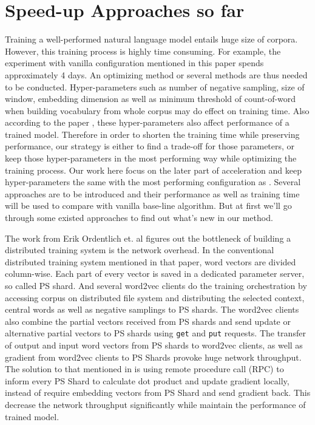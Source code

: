 \section{Speed-up Approaches so far}
Training a well-performed natural language model entails huge size of corpora. However, this training process is highly time consuming. For example, the experiment with vanilla configuration mentioned in this paper spends approximately 4 days. An optimizing method or several methods are thus needed to be conducted. Hyper-parameters such as number of negative sampling, size of window, embedding dimension as well as minimum threshold of count-of-word when building vocabulary from whole corpus may do effect on training time. Also according to the paper \cite{levy2015improving}, these hyper-parameters also affect performance of a trained model. Therefore in order to shorten the training time while preserving performance, our strategy is either to find a trade-off for those parameters, or keep those hyper-parameters in the most performing way while optimizing the training process. Our work here focus on the later part of acceleration and keep hyper-parameters the same with the most performing configuration as \cite{levy2015improving}. Several approaches are to be introduced and their performance as well as training time will be used to compare with vanilla base-line algorithm. But at first we'll go through some existed approaches to find out what's new in our method.

The work from Erik Ordentlich et. al \cite{ordentlich2016network} figures out the bottleneck of building a distributed training system is the network overhead. In the conventional distributed training system mentioned in that paper, word vectors are divided column-wise. Each part of every vector is saved in a dedicated parameter server, so called PS shard. And several word2vec clients do the training orchestration by accessing corpus on distributed file system and distributing the selected context, central words as well as negative samplings to PS shards. The word2vec clients also combine the partial vectors received from PS shards and send update or alternative partial vectors to PS shards using \verb|get| and \verb|put| requests. The transfer of output and input word vectors from PS shards to word2vec clients, as well as gradient from word2vec clients to PS Shards provoke huge network throughput. The solution to that mentioned in \citep{ordentlich2016network} is using remote procedure call (RPC) to inform every PS Shard to calculate dot product and update gradient locally, instead of require embedding vectors from PS Shard and send gradient back. This decrease the network throughput significantly while maintain the performance of trained model.

